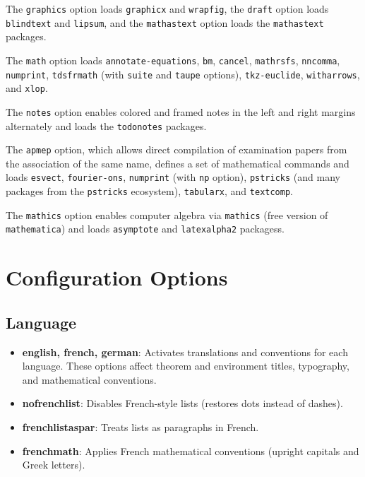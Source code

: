 \documentclass[
    margin=2cm
]{neoschool}
\begin{document}
The \texttt{graphics} option loads \texttt{graphicx} and
\texttt{wrapfig}, the \texttt{draft} option loads \texttt{blindtext} and
\texttt{lipsum}, and the \texttt{mathastext} option loads the
\texttt{mathastext} packages.

The \texttt{math} option loads \texttt{annotate-equations}, \texttt{bm},
\texttt{cancel}, \texttt{mathrsfs}, \texttt{nncomma}, \texttt{numprint},
\texttt{tdsfrmath} (with \texttt{suite} and \texttt{taupe} options),
\texttt{tkz-euclide}, \texttt{witharrows}, and \texttt{xlop}.

The \texttt{notes} option enables colored and framed notes in the left
and right margins alternately and loads the \texttt{todonotes}
packages.

The \texttt{apmep} option, which allows direct compilation of
examination papers from the association of the same name, defines a set
of mathematical commands and loads \texttt{esvect},
\texttt{fourier-ons}, \texttt{numprint} (with \texttt{np} option),
\texttt{pstricks} (and many packages from the \texttt{pstricks}
ecosystem), \texttt{tabularx}, and \texttt{textcomp}.

The \texttt{mathics} option enables computer algebra via
\texttt{mathics} (free version of \texttt{mathematica}) and loads
\texttt{asymptote} and \texttt{latexalpha2} packagess.

\section{Configuration Options}

\subsection{Language}

\begin{itemize}
\item
  \textbf{english, french, german}: Activates translations and
  conventions for each language. These options affect theorem and
  environment titles, typography, and mathematical conventions.
\item
  \textbf{nofrenchlist}: Disables French-style lists (restores dots
  instead of dashes).
\item
  \textbf{frenchlistaspar}: Treats lists as paragraphs in French.
\item
  \textbf{frenchmath}: Applies French mathematical conventions (upright
  capitals and Greek letters).
\end{itemize}
\end{document}
